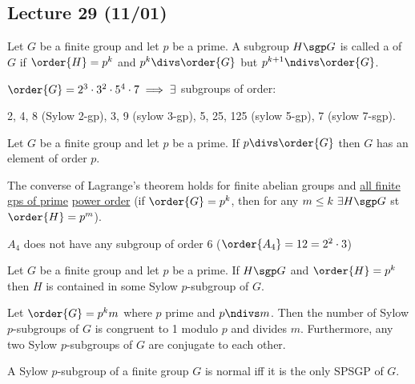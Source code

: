 \subsection*{Lecture 29 (11/01)} %
\begin{definition}
    Let \(G\) be a finite group and let \(p\) be a prime. A subgroup \(H\sgp G\) is called a  of \(G\) if \(\order{H} = p^k\) and \(p^k\divs \order{G}\) but \(p^{k+1}\ndivs \order{G}\).
\end{definition}

\begin{example}
  \(\order{G}=2^3\cdot 3^2\cdot 5^4\cdot 7 \implies \exists\) subgroups of order:

  2, 4, 8 (Sylow 2-gp), 3, 9 (sylow 3-gp), 5, 25, 125 (sylow 5-gp), 7 (sylow 7-sgp).
\end{example}

\begin{corollary}
    Let \(G\) be a finite group and let \(p\) be a prime. If \(p\divs \order{G}\) then \(G\) has an element of order \(p\).
\end{corollary}

\begin{corollary}
  The converse of Lagrange's theorem holds for finite abelian groups and \ul{all finite gps of prime} \ul{power order} (if \(\order{G} = p^k\), then for any \(m\leq k\ \exists H \sgp G\) st \(\order{H}=p^m\)).
\end{corollary}

\begin{fact}
  \(A_4\) does not have any subgroup of order 6 (\(\order{A_4} = 12 = 2^2 \cdot 3\))
\end{fact}

\begin{theorem}
  Let \(G\) be a finite group and let \(p\) be a prime. If \(H\sgp G\) and \(\order{H}=p^k\) then \(H\) is contained in some Sylow \(p\)-subgroup of \(G\).
\end{theorem}

\begin{theorem}
  Let \(\order{G}=p^km\) where \(p\) prime and \(p\ndivs m\). Then the number of Sylow \(p\)-subgroups of \(G\) is congruent to 1 modulo \(p\) and divides \(m\). Furthermore, any two Sylow \(p\)-subgroups of \(G\) are conjugate to each other.
\end{theorem}

\begin{corollary}
  A Sylow \(p\)-subgroup of a finite group \(G\) is normal iff it is the only SPSGP of \(G\).
\end{corollary}

